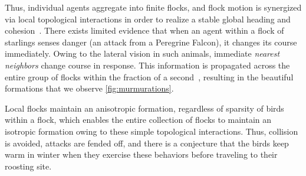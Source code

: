 Thus, individual agents aggregate into finite flocks, and flock motion is synergized via local topological interactions in order to realize a stable global heading and cohesion~\cite{JadbabaieCoord}. There exists limited evidence that when an agent within a flock of starlings senses danger (\eg an attack from a Peregrine Falcon), it changes its course immediately. Owing to the lateral vision in such animals, immediate \textit{nearest neighbors} change course in response. This information is propagated across the entire group of flocks within the fraction of a second~\cite{Ballerini1232}, resulting in the beautiful formations that we observe \cf \autoref{fig:murmurations}. 

Local flocks maintain an anisotropic formation, regardless of sparsity of birds within a flock, which enables the entire collection of flocks to maintain an isotropic formation owing to these simple topological interactions. Thus, collision is avoided, attacks are fended off, and there is a conjecture that the birds keep warm in winter when they exercise these  behaviors before traveling to their roosting site. %
%


